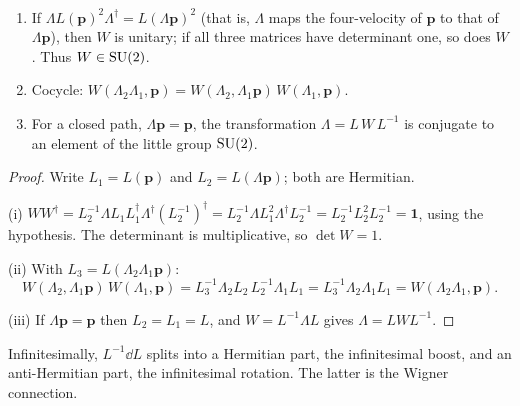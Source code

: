 \begin{theorem}\label{thm:wigner}\ver\
\begin{enumerate}[label=(\roman*)]
\item If $\Lambda L(\mathbf p)^2\Lambda^\dagger=L(\Lambda\mathbf p)^2$ (that is, $\Lambda$ maps the four-velocity of $\mathbf p$ to that of $\Lambda\mathbf p$), then $W$ is unitary; if all three matrices have determinant one, so does $W$. Thus $W\in\mathrm{SU}(2)$.
\item Cocycle: $W(\Lambda_2\Lambda_1,\mathbf p)=W(\Lambda_2,\Lambda_1\mathbf p)\,W(\Lambda_1,\mathbf p)$.
\item For a closed path, $\Lambda\mathbf p=\mathbf p$, the transformation $\Lambda=L\,W\,L^{-1}$ is conjugate to an element of the little group $\mathrm{SU}(2)$.
\end{enumerate}
\end{theorem}
\begin{proof}
Write $L_1=L(\mathbf p)$ and $L_2=L(\Lambda\mathbf p)$; both are Hermitian.

(i) $WW^\dagger=L_2^{-1}\Lambda L_1L_1^\dagger\Lambda^\dagger(L_2^{-1})^\dagger=L_2^{-1}\Lambda L_1^2\Lambda^\dagger L_2^{-1}=L_2^{-1}L_2^2L_2^{-1}=\mathbf 1$, using the hypothesis. The determinant is multiplicative, so $\det W=1$.

(ii) With $L_3=L(\Lambda_2\Lambda_1\mathbf p)$:
\[
W(\Lambda_2,\Lambda_1\mathbf p)\,W(\Lambda_1,\mathbf p)=L_3^{-1}\Lambda_2L_2\,L_2^{-1}\Lambda_1L_1=L_3^{-1}\Lambda_2\Lambda_1L_1=W(\Lambda_2\Lambda_1,\mathbf p).
\]

(iii) If $\Lambda\mathbf p=\mathbf p$ then $L_2=L_1=L$, and $W=L^{-1}\Lambda L$ gives $\Lambda=LWL^{-1}$.
\end{proof}


Infinitesimally, $L^{-1}\dd L$ splits into a Hermitian part, the infinitesimal boost, and an anti-Hermitian part, the infinitesimal rotation. The latter is the Wigner connection.


